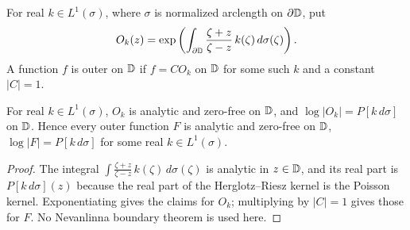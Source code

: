\begin{definition}
  \label{def:outer_factor}
  \leanok
  For real $k\in L^1(\sigma)$, where $\sigma$ is normalized arclength on
  $\partial\mathbb{D}$, put
  \[
    O_k(z)=\exp\left(\int_{\partial\mathbb{D}}
      \frac{\zeta+z}{\zeta-z}\,k(\zeta)\,d\sigma(\zeta)\right).
  \]
  A function $f$ is outer on $\mathbb{D}$ if $f=C O_k$ on $\mathbb{D}$ for some such $k$
  and a constant $|C|=1$.
\end{definition}

\begin{theorem}
  \label{thm:outer_function_properties}
  \leanok
  For real $k\in L^1(\sigma)$, $O_k$ is analytic and zero-free on $\mathbb{D}$, and
  $\log|O_k|=P[k\,d\sigma]$ on $\mathbb{D}$. Hence every outer function $F$ is
  analytic and zero-free on $\mathbb{D}$, $\log|F|=P[k\,d\sigma]$ for some real
  $k\in L^1(\sigma)$.
  \begin{proof}
    \leanok
    The integral $\int\frac{\zeta+z}{\zeta-z}\,k(\zeta)\,d\sigma(\zeta)$ is
    analytic in $z\in\mathbb{D}$, and its real part is $P[k\,d\sigma](z)$ because the
    real part of the Herglotz--Riesz kernel is the Poisson kernel.
    Exponentiating gives the claims for $O_k$; multiplying by $|C|=1$ gives
    those for $F$. No Nevanlinna boundary theorem is used here.
  \end{proof}
\end{theorem}

